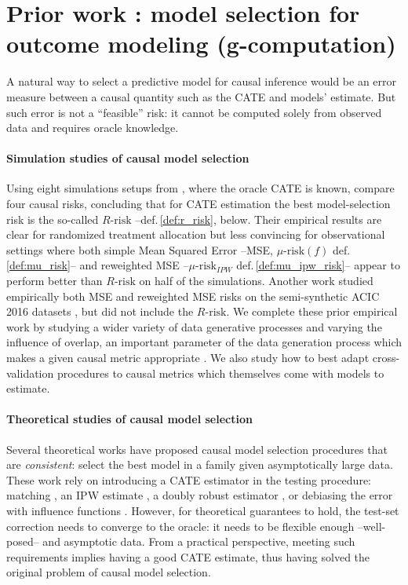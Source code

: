 \documentclass[10pt,twocolumn]{article}
\begin{document}
\section{Prior work : model selection for outcome modeling (g-computation)}\label{apd:prior_work}

A natural way to select a predictive model for causal inference would be
an error measure between a causal quantity such as the CATE and models' estimate. But such error is
not a ``feasible'' risk: it cannot be computed solely from observed data
and requires oracle knowledge.


\paragraph{Simulation studies of causal model selection}

Using eight simulations setups from \cite{powers_methods_2018}, where
the oracle CATE is known, \citet{schuler_comparison_2018} compare four
causal risks, concluding that for CATE estimation the best
model-selection risk is the so-called $R\text{-risk}$
\cite{nie_quasioracle_2017} --def.\,\ref{def:r_risk}, below. Their
empirical results are clear for randomized treatment allocation but less
convincing for observational settings where both simple Mean Squared
Error --MSE, $\mu\text{-risk}(f)$ def.\,\ref{def:mu_risk}-- and
reweighted MSE --$\mu\text{-risk}_{IPW}$ def.\,\ref{def:mu_ipw_risk}--
appear to perform better than $R\text{-risk}$ on half of the simulations.
Another work \cite{alaa_validating_2019} studied empirically both MSE and
reweighted MSE risks on the semi-synthetic ACIC 2016 datasets
\cite{dorie_automated_2019}, but did not include the $R\text{-risk}$. We complete these
prior empirical work by studying a wider variety of data generative
processes and varying the influence of overlap, an important parameter of
the data generation process which makes a given causal metric appropriate
\cite{damour_overlap_2020}. We also study how to best adapt
cross-validation procedures to causal metrics which themselves come with
models to estimate.

\paragraph{Theoretical studies of causal model selection}

Several theoretical works have proposed causal model selection procedures
that are \emph{consistent}: select the best model in a family given
asymptotically large data. These work rely on introducing a
CATE estimator in the testing procedure: matching
\citep{rolling_model_2014}, an IPW estimate
\citep{gutierrez_causal_2016}, a doubly robust estimator
\citep{saito_counterfactual_2020}, or debiasing the error with influence
functions \cite{alaa_validating_2019}. However, for theoretical
guarantees to hold, the test-set correction needs to converge to the
oracle: it needs to be flexible enough --well-posed-- and asymptotic
data. From a practical perspective, meeting such requirements
implies having a good CATE estimate, thus having solved
the original problem of causal model selection.
\end{document}
